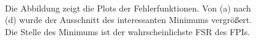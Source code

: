 \begin{figure}[h]
{{{		}\\
	}}
	\caption[FSR-Bestimmung]{Die Abbildung zeigt die Plots der Fehlerfunktionen.
	Von (a) nach (d) wurde der Ausschnitt des interessanten Minimums vergrößert. Die
	Stelle des Minimums ist der wahrscheinlichste FSR des FPIs.}
	\label{fig:nonius_FSR_messung}
\end{figure}

